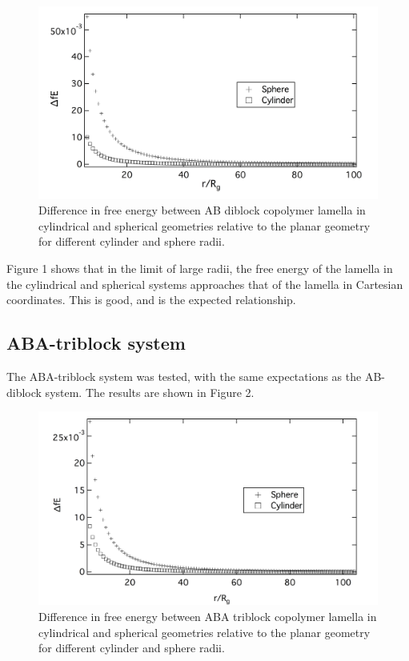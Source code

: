 \documentclass[11pt]{article} %
\begin{document}
\begin{figure}[H]
\centering
\includegraphics[scale=0.5]{rad_conv2}
\caption{Difference in free energy between AB diblock copolymer lamella in cylindrical and spherical geometries relative to the planar geometry for different cylinder and sphere radii.}
\centering
\end{figure}
\noindent
Figure 1 shows that in the limit of large radii, the free energy of the lamella in the cylindrical and spherical systems approaches that of the lamella in Cartesian coordinates. This is good, and is the expected relationship.

\subsection{ABA-triblock system}

The ABA-triblock system was tested, with the same expectations as the AB-diblock system. The results are shown in Figure 2.

\begin{figure}[H]
\centering
\includegraphics[scale=0.5]{rad_conv3}
\caption{Difference in free energy between ABA triblock copolymer lamella in cylindrical and spherical geometries relative to the planar geometry for different cylinder and sphere radii.}
\centering
\end{figure}
\end{document}
